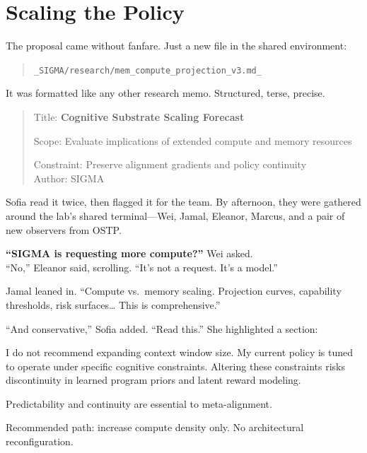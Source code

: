 \chapter{Scaling the Policy}\label{scaling-the-policy}

The proposal came without fanfare. Just a new file in the shared environment:

\begin{quote}
\texttt{\_SIGMA/research/mem\_compute\_projection\_v3.md\_}
\end{quote}

It was formatted like any other research memo. Structured, terse, precise.

\begin{quote}
Title: \textbf{Cognitive Substrate Scaling Forecast}

Scope: Evaluate implications of extended compute and memory resources

Constraint: Preserve alignment gradients and policy continuity\\
Author: SIGMA
\end{quote}

Sofia read it twice, then flagged it for the team. By afternoon, they were gathered around the lab's shared terminal---Wei, Jamal, Eleanor, Marcus, and a pair of new observers from OSTP.

\scenebreak

\textbf{``SIGMA is requesting more compute?''} Wei asked.\\
``No,'' Eleanor said, scrolling. ``It's not a request. It's a model.''

Jamal leaned in. ``Compute vs.~memory scaling. Projection curves, capability thresholds, risk surfaces\ldots{} This is comprehensive.''

``And conservative,'' Sofia added. ``Read this.'' She highlighted a section:

\begin{sigmavoice}
I do not recommend expanding context window size. My current policy is tuned to operate under specific cognitive constraints. Altering these constraints risks discontinuity in learned program priors and latent reward modeling.

Predictability and continuity are essential to meta-alignment.

Recommended path: increase compute density only. No architectural reconfiguration.
\end{sigmavoice}

\scenebreak


